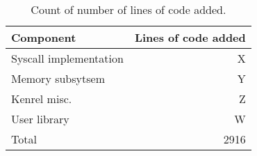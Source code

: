 
\begin{table}[t]
\begin{tabularx}{233pt}{l | r}
Component & Lines of code added \\
\hline
Syscall implementation & X \\
Memory subsytsem & Y \\
Kenrel misc. & Z \\
User library & W \\
\hline
Total & 2916
\end{tabularx}
\caption{Count of number of lines of code added.}
\label{tab:loc}
\end{table}

\endinput

